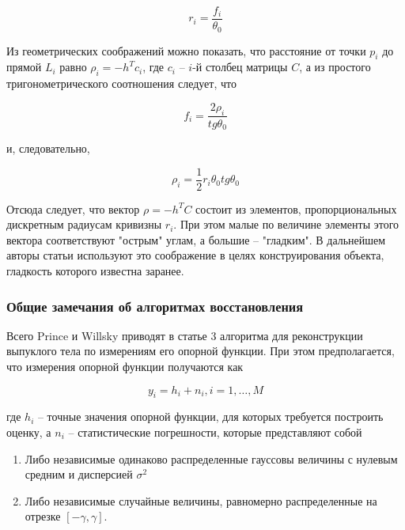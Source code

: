 \documentclass[a4paper, 12pt, titlepage]{article}
\theoremstyle{definition}
\theoremstyle{plain}
\theoremstyle{plain}
\begin{document}
\begin{equation}
r_{i} = \frac{f_{i}}{\theta_{0}}
\end{equation}

Из геометрических соображений можно показать, что расстояние от точки $p_{i}$
до прямой $L_{i}$ равно $\rho_{i} = -h^{T} c_{i}$, где $c_{i}$ -- $i$-й столбец
матрицы $C$, а из простого тригонометрического соотношения следует, что

\begin{equation}
f_{i} = \frac{2 \rho_{i}}{tg \theta_{0}}
\end{equation}

и, следовательно,

\begin{equation}
\rho_{i} = \frac{1}{2} r_{i} \theta_{0} tg \theta_{0}
\end{equation}

Отсюда следует, что вектор $\rho = - h^{T} C$ состоит из элементов,
пропорциональных дискретным радиусам кривизны $r_{i}$. При этом малые по
величине элементы этого вектора соответствуют "острым" углам, а большие --
"гладким". В дальнейшем авторы статьи используют это соображение в целях
конструирования объекта, гладкость которого известна заранее.

\subsubsection{Общие замечания об алгоритмах восстановления}
\label{sec:history/PrinceW90/algo-common}

Всего Prince и Willsky приводят в статье 3 алгоритма для реконструкции выпуклого
тела по измерениям его опорной функции. При этом предполагается, что измерения
опорной функции получаются как

\begin{equation}
y_{i} = h_{i} + n_{i}, i = 1, \ldots, M
\end{equation}

где $h_{i}$ -- точные значения опорной функции, для которых требуется построить
оценку, а $n_{i}$ -- статистические погрешности, которые представляют собой

\begin{enumerate}
 \item Либо независимые одинаково распределенные гауссовы величины с нулевым
 средним и дисперсией $\sigma^{2}$
 \item Либо независимые случайные величины, равномерно распределенные на отрезке
 $[ - \gamma, \gamma]$.
\end{enumerate}
\end{document}
